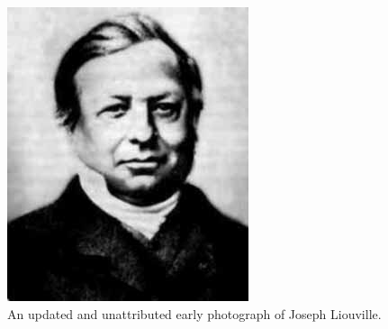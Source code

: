 \begin{figure}
    \includegraphics[scale=0.5]{images/Joseph_liouville}
    \caption{An updated and unattributed early photograph of Joseph Liouville.}
\end{figure}

\clearpage
